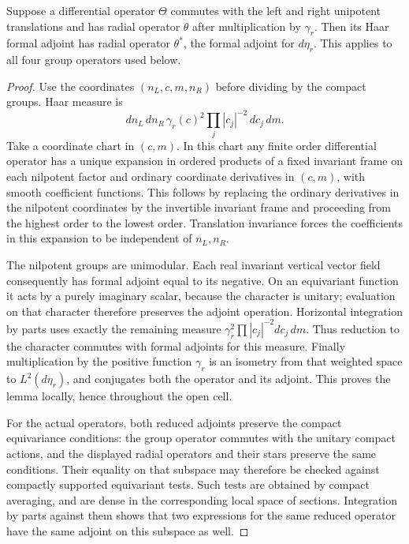 \begin{lemma}\label{jf-radial-adjoint}
Suppose a differential operator \(\Theta\) commutes with
the left and right unipotent translations and has radial
operator \(\theta\) after multiplication by \(\gamma_r\).
Then its Haar formal adjoint has radial operator
\(\theta^*\), the formal adjoint for \(d\eta_r\).
This applies to all four group operators used below.
\end{lemma}

\begin{proof}
Use the coordinates \((n_L,c,m,n_R)\) before dividing
by the compact groups.  Haar measure is
\[
 dn_L\,dn_R\,
     \gamma_r(c)^2\prod_j|c_j|^{-2}\,dc_j\,dm.
\]
Take a coordinate chart in \((c,m)\).  In this chart any
finite order differential operator has a unique expansion
in ordered products of a fixed invariant frame on each
nilpotent factor and ordinary coordinate derivatives in
\((c,m)\), with smooth coefficient functions.  This follows
by replacing the ordinary derivatives in the nilpotent
coordinates by the invertible invariant frame and proceeding
from the highest order to the lowest order.  Translation
invariance forces the coefficients in this expansion to be
independent of \(n_L,n_R\).

The nilpotent groups are unimodular.  Each real invariant
vertical vector field consequently has formal adjoint equal
to its negative.  On an equivariant function it acts by a
purely imaginary scalar, because the character is unitary;
evaluation on that character therefore preserves the adjoint
operation.  Horizontal integration by parts uses exactly
the remaining measure
\(\gamma_r^2\prod|c_j|^{-2}dc_j\,dm\).
Thus reduction to the character commutes with formal
adjoints for this measure.  Finally multiplication by the
positive function \(\gamma_r\) is an isometry from that
weighted space to \(L^2(d\eta_r)\), and conjugates both
the operator and its adjoint.  This proves the lemma locally,
hence throughout the open cell.

For the actual operators, both reduced adjoints preserve
the compact equivariance conditions: the group operator
commutes with the unitary compact actions, and the displayed
radial operators and their stars preserve the same conditions.
Their equality on that subspace may therefore be checked
against compactly supported equivariant tests.  Such tests
are obtained by compact averaging, and are dense in the
corresponding local space of sections.  Integration by parts
against them shows that two expressions for the same reduced
operator have the same adjoint on this subspace as well.
\end{proof}

